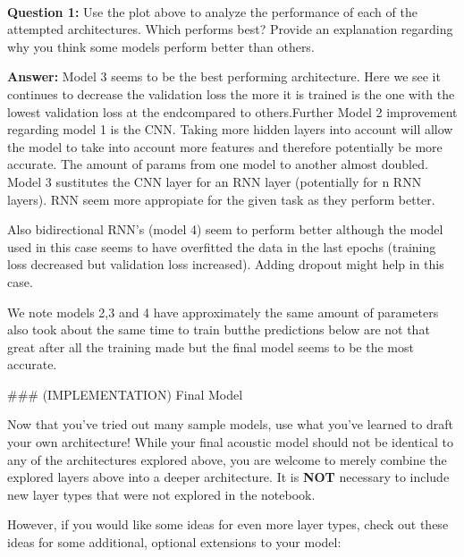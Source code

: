 \documentclass[11pt]{article}
\begin{document}
    \begin{center}
    \end{center}
    { \hspace*{\fill} \\}
    
    \textbf{Question 1:} Use the plot above to analyze the performance of
each of the attempted architectures. Which performs best? Provide an
explanation regarding why you think some models perform better than
others.

\textbf{Answer:} Model 3 seems to be the best performing architecture.
Here we see it continues to decrease the validation loss the more it is
trained is the one with the lowest validation loss at the endcompared to
others.Further Model 2 improvement regarding model 1 is the CNN. Taking
more hidden layers into account will allow the model to take into
account more features and therefore potentially be more accurate. The
amount of params from one model to another almost doubled. Model 3
sustitutes the CNN layer for an RNN layer (potentially for n RNN
layers). RNN seem more appropiate for the given task as they perform
better.

Also bidirectional RNN's (model 4) seem to perform better although the
model used in this case seems to have overfitted the data in the last
epochs (training loss decreased but validation loss increased). Adding
dropout might help in this case.

We note models 2,3 and 4 have approximately the same amount of
parameters also took about the same time to train butthe predictions
below are not that great after all the training made but the final model
seems to be the most accurate.

     \#\#\# (IMPLEMENTATION) Final Model

Now that you've tried out many sample models, use what you've learned to
draft your own architecture! While your final acoustic model should not
be identical to any of the architectures explored above, you are welcome
to merely combine the explored layers above into a deeper architecture.
It is \textbf{NOT} necessary to include new layer types that were not
explored in the notebook.

However, if you would like some ideas for even more layer types, check
out these ideas for some additional, optional extensions to your model:
\end{document}
